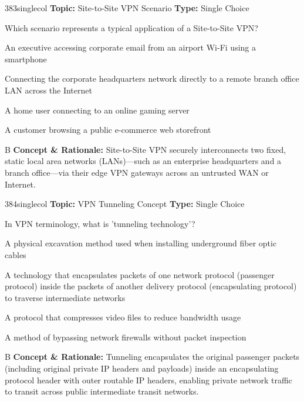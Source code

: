 \begin{qcard}{383}{singlecol}
\textcolor{darkslate!75}{\small\textbf{Topic:} Site-to-Site VPN Scenario \hfill \textbf{Type:} Single Choice}\vspace{0.4em}\par
Which scenario represents a typical application of a Site-to-Site VPN?
\begin{qoptions}
\item An executive accessing corporate email from an airport Wi-Fi using a smartphone
\item Connecting the corporate headquarters network directly to a remote branch office LAN across the Internet
\item A home user connecting to an online gaming server
\item A customer browsing a public e-commerce web storefront
\end{qoptions}
\end{qcard}
\nopagebreak
\begin{explainbox}{B}
\textbf{Concept \& Rationale:} Site-to-Site VPN securely interconnects two fixed, static local area networks (LANs)—such as an enterprise headquarters and a branch office—via their edge VPN gateways across an untrusted WAN or Internet.
\end{explainbox}

\begin{qcard}{384}{singlecol}
\textcolor{darkslate!75}{\small\textbf{Topic:} VPN Tunneling Concept \hfill \textbf{Type:} Single Choice}\vspace{0.4em}\par
In VPN terminology, what is 'tunneling technology'?
\begin{qoptions}
\item A physical excavation method used when installing underground fiber optic cables
\item A technology that encapsulates packets of one network protocol (passenger protocol) inside the packets of another delivery protocol (encapsulating protocol) to traverse intermediate networks
\item A protocol that compresses video files to reduce bandwidth usage
\item A method of bypassing network firewalls without packet inspection
\end{qoptions}
\end{qcard}
\nopagebreak
\begin{explainbox}{B}
\textbf{Concept \& Rationale:} Tunneling encapsulates the original passenger packets (including original private IP headers and payloads) inside an encapsulating protocol header with outer routable IP headers, enabling private network traffic to transit across public intermediate transit networks.
\end{explainbox}

